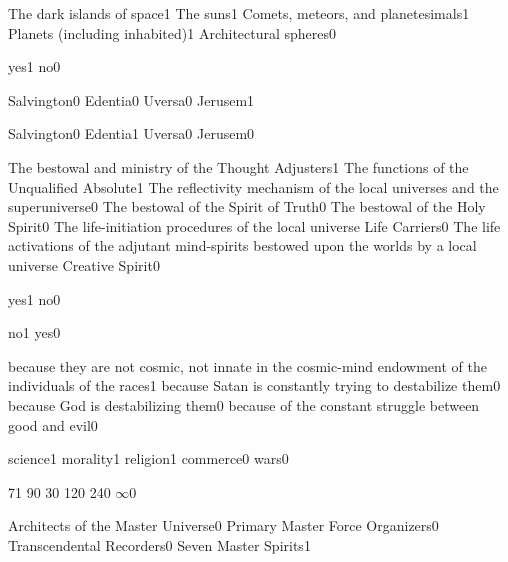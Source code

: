 {The dark islands of space}{1}
{The suns}{1}
{Comets, meteors, and planetesimals}{1}
{Planets (including inhabited)}{1}
{Architectural spheres}{0}
\qstop

{yes}{1}
{no}{0}
\qstop

{Salvington}{0}
{Edentia}{0}
{Uversa}{0}
{Jerusem}{1}
\qstop

{Salvington}{0}
{Edentia}{1}
{Uversa}{0}
{Jerusem}{0}
\qstop


{The bestowal and ministry of the Thought Adjusters}{1}
{The functions of the Unqualified Absolute}{1}
{The reflectivity mechanism of the local universes and the superuniverse}{0}
{The bestowal of the Spirit of Truth}{0}
{The bestowal of the Holy Spirit}{0}
{The life-initiation procedures of the local universe Life Carriers}{0}
{The life activations of the adjutant mind-spirits bestowed upon the worlds by a local universe Creative Spirit}{0}
\qstop

{yes}{1}
{no}{0}
\qstop

{no}{1}
{yes}{0}
\qstop

{because they are not cosmic, not innate in the cosmic-mind endowment of the individuals of the races}{1}
{because Satan is constantly trying to destabilize them}{0}
{because God is destabilizing them}{0}
{because of the constant struggle between good and evil}{0}
\qstop

{science}{1}
{morality}{1}
{religion}{1}
{commerce}{0}
{wars}{0}
\qstop

{7}{1}
{9}{0}
{3}{0}
{12}{0}
{24}{0}
{$\infty$}{0}
\qstop

{Architects of the Master Universe}{0}
{Primary Master Force Organizers}{0}
{Transcendental Recorders}{0}
{Seven Master Spirits}{1}
\qstop


